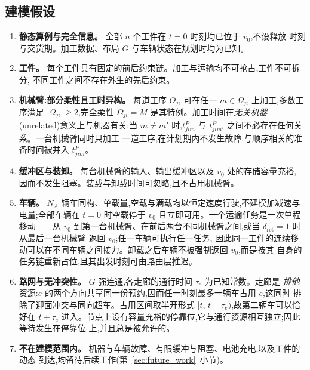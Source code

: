 \documentclass[manuscript,screen,review]{acmart}
\begin{document}
\subsection{建模假设}
\label{sec:assumptions}

\begin{enumerate}[label=\textbf{A\arabic*.},leftmargin=*,topsep=2pt,itemsep=2pt]
\item \textbf{静态算例与完全信息。} 全部 $n$ 个工件在 $t=0$ 时刻均已位于 $v_0$,不设释放
时刻与交货期。加工数据、布局 $G$ 与车辆状态在规划时均为已知。

\item \textbf{工件。} 每个工件具有固定的前后约束链。加工与运输均不可抢占,工件不可拆分,
不同工件之间不存在外生的先后约束。

\item \textbf{机械臂:部分柔性且工时异构。} 每道工序 $O_{ji}$ 可在任一
$m\in\Omega_{ji}$ 上加工,多数工序满足 $|\Omega_{ji}|\ge 2$,完全柔性
$\Omega_{ji}=M$ 是其特例。加工时间在\emph{无关机器}(unrelated)意义上与机器有关:当
$m\neq m'$ 时,$t^P_{jim}$ 与 $t^P_{jim'}$ 之间不必存在任何关系。一台机械臂同时只加工
一道工序,在计划期内不发生故障,与顺序相关的准备时间被并入 $t^P_{jim}$。

\item \textbf{缓冲区与装卸。} 每台机械臂的输入、输出缓冲区以及 $v_0$ 处的存储容量充裕,
因而不发生阻塞。装载与卸载时间可忽略,且不占用机械臂。

\item \textbf{车辆。} $N_A$ 辆车同构、单载量,空载与满载均以恒定速度行驶,不建模加减速与
电量;全部车辆在 $t=0$ 时空载停于 $v_0$ 且立即可用。一个运输任务是一次单程移动——从 $v_0$
到第一台机械臂、在前后两台不同机械臂之间,或当 $\delta_{\mathrm{ret}}=1$ 时从最后一台机械臂
返回 $v_0$;任一车辆可执行任一任务,
因此同一工件的连续移动可以在不同车辆之间接力。卸载之后车辆不被强制返回 $v_0$,而是按其
自身的任务链重新占位,且其出发时刻可由路由层推迟。

\item \textbf{路网与无冲突性。} $G$ 强连通,各走廊的通行时间 $\tau_e$ 为已知常数。走廊是
\emph{排他}资源:$e$ 的两个方向共享同一份预约,因而任一时刻最多一辆车占用 $e$,这同时
排除了迎面冲突与同向超车。占用区间取半开形式 $[t,\,t+\tau_e)$,故第二辆车可以恰好在
$t+\tau_e$ 进入。节点上设有容量充裕的停靠位,它与通行资源相互独立;因此等待发生在停靠位
上,并且总是被允许的。

\item \textbf{不在建模范围内。} 机器与车辆故障、有限缓冲与阻塞、电池充电,以及工件的动态
到达,均留待后续工作(第~\ref{sec:future_work}~小节)。
\end{enumerate}
\end{document}
